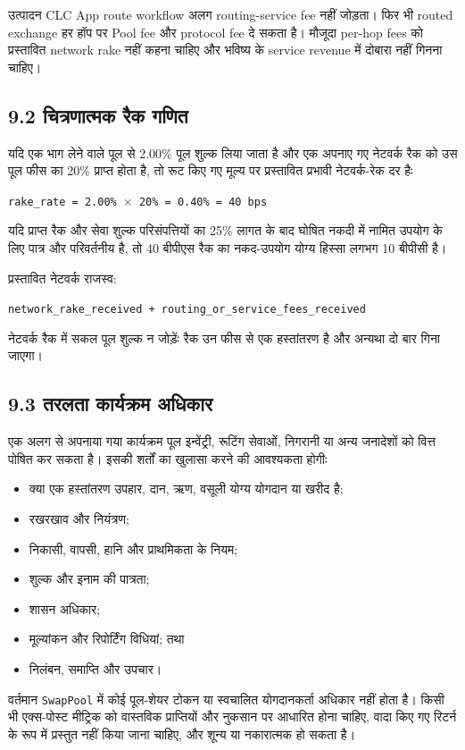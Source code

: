 \documentclass[11pt]{article}
\begin{document}
उत्पादन CLC App route workflow अलग routing-service fee नहीं जोड़ता। फिर भी routed exchange हर हॉप पर Pool fee और protocol fee दे सकता है। मौजूदा per-hop fees को प्रस्तावित network rake नहीं कहना चाहिए और भविष्य के service revenue में दोबारा नहीं गिनना चाहिए।

\subsection*{9.2 चित्रणात्मक रैक गणित}

यदि एक भाग लेने वाले पूल से 2.00\% पूल शुल्क लिया जाता है और एक अपनाए गए नेटवर्क रैक को उस पूल फीस का 20\% प्राप्त होता है, तो रूट किए गए मूल्य पर प्रस्तावित प्रभावी नेटवर्क-रेक दर हैः

\texttt{rake\_rate = 2.00\% $\times$ 20\% = 0.40\% = 40 bps}

यदि प्राप्त रैक और सेवा शुल्क परिसंपत्तियों का 25\% लागत के बाद घोषित नकदी में नामित उपयोग के लिए पात्र और परिवर्तनीय है, तो 40 बीपीएस रैक का नकद-उपयोग योग्य हिस्सा लगभग 10 बीपीसी है।

प्रस्तावित नेटवर्क राजस्व:

\texttt{network\_rake\_received + routing\_or\_service\_fees\_received}

नेटवर्क रैक में सकल पूल शुल्क न जोड़ेंः रैक उन फीस से एक हस्तांतरण है और अन्यथा दो बार गिना जाएगा।

\subsection*{9.3 तरलता कार्यक्रम अधिकार}

एक अलग से अपनाया गया कार्यक्रम पूल इन्वेंट्री, रूटिंग सेवाओं, निगरानी या अन्य जनादेशों को वित्त पोषित कर सकता है। इसकी शर्तों का खुलासा करने की आवश्यकता होगीः

\begin{itemize}[leftmargin=*]
\item क्या एक हस्तांतरण उपहार, दान, ऋण, वसूली योग्य योगदान या खरीद है;
\item रखरखाव और नियंत्रण;
\item निकासी, वापसी, हानि और प्राथमिकता के नियम;
\item शुल्क और इनाम की पात्रता;
\item शासन अधिकार;
\item मूल्यांकन और रिपोर्टिंग विधियां; तथा
\item निलंबन, समाप्ति और उपचार।
\end{itemize}
वर्तमान \texttt{SwapPool} में कोई पूल-शेयर टोकन या स्वचालित योगदानकर्ता अधिकार नहीं होता है। किसी भी एक्स-पोस्ट मीट्रिक को वास्तविक प्राप्तियों और नुकसान पर आधारित होना चाहिए, वादा किए गए रिटर्न के रूप में प्रस्तुत नहीं किया जाना चाहिए, और शून्य या नकारात्मक हो सकता है।
\end{document}

